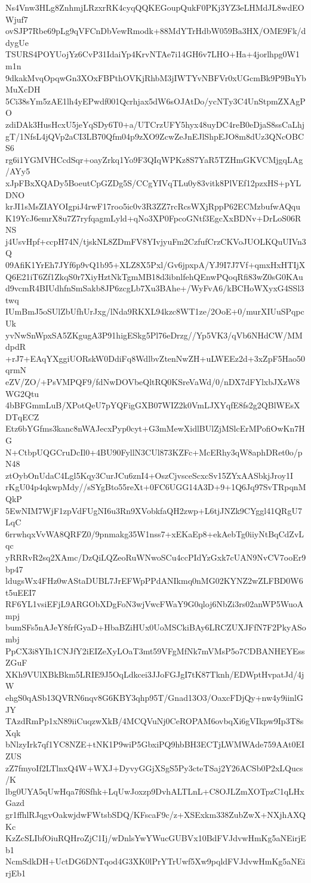 Ns4Vnw3HLg8ZnhmjLRzxrRK4cyqQQKEGoupQukF0PKj3YZ3eLHMdJL8wdEOWjuf7
ovSJP7Rbe69pLg9qVFCnDbVewRmodk+88MdYTrHdbW059Ba3HX/OME9Fk/ddygUe
TSURS4POYUojYz6CvP31IdaiYp4KrvNTAe7i14GH6v7LHO+Ha+4jorlhpg0W1m1n
9dkakMvqOpqwGn3XOxFBPthOVKjRhbM3jIWTYvNBFVr0xUGcmBk9P9BuYbMuXcDH
5Ci38sYm5zAE1lh4yEPwdf001Qcrhjax5dW6sOJAtDo/ycNTy3C4UnStpmZXAgPO
zdiDAk3HusHcxU5jeYqSDy6T0+a/UTCrzUFY5hyx48uyDC4reB0eDjaS8ssCaLhj
gT/1NfsL4jQVp2aCI3LB70Qfm04p9zXO9ZcwZeJnEJlShpEJO8m8dUz3QNcOBCS6
rg6i1YGMVHCcdSqr+oayZrkq1Yo9F3QIqWPKz8S7YaR5TZHmGKVCMjgqLAg/AYy5
xJpFBxXQADy5BoeutCpGZDg5S/CCgYIVqTLu0y83vitk8PlVEf12pzxHS+pYLDNO
krJI1sMsZIAYOIgpiJ4rwF17roo5ic0v3R3ZZ7rcRcsWXjRppP62ECMzbufwAQqu
K19YcJ6emrX8u7Z7ryfqagmLyld+qNo3XP0FpcoGNtf3EgcXxBDNv+DrLoS06RNS
j4UsvHpf+ccpH74N/tjskNL8ZDmFV8YIvjyuFm2CzfufCrzCKVoJUOLKQuUIVn3Q
09AfiK1YrEh7JYf6p9vQ1b95+XLZ8X5Pxl/Gv6jpxpA/YJ9I7J7Vf+qmxHxHTIjX
Q6E21iT6Zf1ZkqS0r7XiyHztNkTgmMB18d3ibnlfehQEnwPQoqRfi83wZ0sG0KAu
d9vcmR4BIUdhfnSmSakb8JP6zcgLb7Xu3BAhe+/WyFvA6/kBCHoWXyxG4SSl3twq
IUmBmJ5oSUlZbUfhUrJxg/lNda9RKXL94kzc8WT1ze/2OoE+0/murXIUuSPqpcUk
yvNwSnWpxSA5ZKgugA3P91higESkg5Pl76eDrzg//Yp5VK3/qVb6NHdCW/MMdpdR
+rJ7+EAqYXggiUORskW0DdiFq8WdlbvZtenNwZH+uLWEEz2d+3xZpF5Hao50qrmN
eZV/ZO/+PsVMPQF9/fdNwDOVbeQltRQ0KSreVaWd/0/nDX7dFYlxbJXzW8WG2Qtu
4bBFGmmLuB/XPotQeU7pYQFigGXB07WIZ2k0VmLJXYqfE8fs2g2QBlWEsXDTqECZ
Etz6bYGfms3kanc8nWAJecxPyp0cyt+G3mMewXidlBUlZjMSlcErMPofiOwKn7HG
N+CtbpUQGCruDcIl0+4BU90FyllN3CUl873KZFc+McERhy3qW8aphDRet0o/pN48
ztOybOnUdaC4Lgl5Kqy3CurJCu6znI4+OszCjvsceScxcSv15ZYxAASbkjJroy1I
rKgU04p4qkwpMdy//sSYgBto55reXt+0FC6UGG14A3D+9+1Q6Jq97SvTRpqnMQkP
5EwNIM7WjF1zpVdFUgNI6u3Rn9XVobkfaQH2zwp+L6tjJNZk9CYggl41QRgU7LqC
6rrwhqxVvWA8QRFZ0/9pnmakg35W1nss7+xEKaEp8+ekAebTg0iiyNtBqCdZvLqc
yRRRvR2sq2XAmc/DzQiLQZeoRuWNwoSCu4ccPIdYzGxk7cUAN9NvCV7ooEr9bp47
ldugsWx4FHz0wAStaDUBL7JrEFWpPPdANIkmq0nMG02KYNZ2wZLFBD0W6t5uEEI7
RF6YL1vsiEFjL9ARGObXDgFoN3wjVwcFWaY9G0qloj6NbZi3rs02anWP5WuoAmpj
bumSFs5nAJeY8frfGyaD+HbaBZiHUx0UoMSCkiBAy6LRCZUXJFfN7F2PkyASombj
PpCX3i8YIh1CNJfY2iEIZeXyLOaT3mt59VFgMfNk7mVMsP5o7CDBANHEYEssZGuF
XKh9VUlXBkBkm5LRIE9J5OqLdkcei3JJoFGJgI7tK87Tknh/EDWptHvpatJd/4jW
ehgS0qASb13QVRN6nqv8G6KBY3qhp95T/Gnad13O3/OaxcFDjQy+nw4y9iinlGJY
TAzdRmPp1xN89iiCuqzwXkB/4MCQVuNj0CeROPAM6ovbqXi6gVIkpw9Ip3T8sXqk
bNlzyIrk7qf1YC8NZE+tNK1P9wiP5GbxiPQ9hbBH3ECTjLWMWAde759AAt0EIZUS
zZ7fmyoIf2LTlnxQ4W+WXJ+DyvyGGjXSgS5Py3cteTSaj2Y26ACSb0P2xLQucs/K
lbg0UYA5qUwHqa7f6Sfhk+LqUwJoxzp9DvhALTLnL+C8OJLZmXOTpzC1qLHxGazd
gr1ffhlRJqgvOakwjdwFWtsbSDQ/KFscaF9c/z+XSExkm338ZubZwX+NXjhAXQKc
KzZcSLIbfOiuRQHroZjC1Ij/wDnlsYwYWucGUBVx10BdFVJdvwHmKg5aNEirjEb1
NcmSdkDH+UctDG6DNTqod4G3XK0lPrYTrUwf5Xw9pqldFVJdvwHmKg5aNEirjEb1
